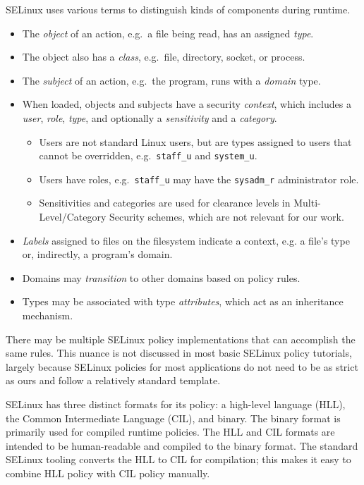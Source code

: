 SELinux uses various terms to distinguish kinds of components during runtime.
\begin{itemize}
  \item The \emph{object} of an action, e.g.\ a file being read, has an assigned \emph{type}.
  \item The object also has a \emph{class}, e.g.\ file, directory, socket, or process.
  \item The \emph{subject} of an action, e.g.\ the program, runs with a \emph{domain} type.
  \item When loaded, objects and subjects have a security \emph{context}, which includes a \emph{user}, \emph{role}, \emph{type}, and optionally a \emph{sensitivity} and a \emph{category}.
    \begin{itemize}
        \item Users are not standard Linux users, but are types assigned to users that cannot be overridden, e.g.\ \verb|staff_u| and \verb|system_u|.
        \item Users have roles, e.g.\ \verb|staff_u| may have the \verb|sysadm_r| administrator role.
      \item Sensitivities and categories are used for clearance levels in Multi-Level/Category Security schemes, which are not relevant for our work.
    \end{itemize}
  \item \emph{Labels} assigned to files on the filesystem indicate a context, e.g. a file's type or, indirectly, a program's domain.
  \item Domains may \emph{transition} to other domains based on policy rules.
  \item Types may be associated with type \emph{attributes}, which act as an inheritance mechanism.
\end{itemize}

There may be multiple SELinux policy implementations that can accomplish the same rules.
This nuance is not discussed in most basic SELinux policy tutorials,
largely because SELinux policies for most applications do not need to be as strict as ours and follow a relatively standard template.

SELinux has three distinct formats for its policy: a high-level language (HLL), the Common Intermediate Language (CIL), and binary.
The binary format is primarily used for compiled runtime policies.
The HLL and CIL formats are intended to be human-readable and compiled to the binary format.
The standard SELinux tooling converts the HLL to CIL for compilation;
this makes it easy to combine HLL policy with CIL policy manually.


